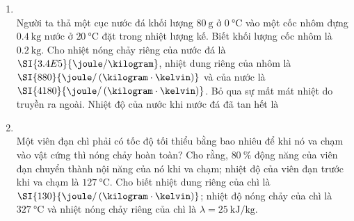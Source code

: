\begin{enumerate}[label=\bfseries Câu \arabic*:, leftmargin=1.7cm]
\item {}\\
Người ta thả một cục nước đá khối lượng $\SI{80}{\gram}$ ở $\SI{0}{\celsius}$ vào một cốc nhôm đựng $\SI{0.4}{\kilogram}$ nước ở $\SI{20}{\celsius}$ đặt trong nhiệt lượng kế. Biết khối lượng cốc nhôm là $\SI{0.2}{\kilogram}$. Cho nhiệt nóng chảy riêng của nước đá là $\SI{3.4E5}{\joule/\kilogram}$, nhiệt dung riêng của nhôm là $\SI{880}{\joule/\left(\kilogram\cdot\kelvin\right)}$ và của nước là $\SI{4180}{\joule/\left(\kilogram\cdot\kelvin\right)}$. Bỏ qua sự mất mát nhiệt do truyền ra ngoài. Nhiệt độ của nước khi nước đá đã tan hết là

\item {}\\
Một viên đạn chì phải có tốc độ tối thiểu bằng bao nhiêu để khi nó va chạm vào vật cứng thì nóng chảy hoàn toàn? Cho rằng, $\SI{80}{\percent}$ động năng của viên đạn chuyển thành nội năng của nó khi va chạm; nhiệt độ của viên đạn trước khi va chạm là $\SI{127}{\celsius}$. Cho biết nhiệt dung riêng của chì là $\SI{130}{\joule/\left(\kilogram\cdot\kelvin\right)}$; nhiệt độ nóng chảy của chì là $\SI{327}{\celsius}$ và nhiệt nóng chảy riêng của chì là $\lambda=\SI{25}{\kilo\joule/\kilogram}$.
\end{enumerate}
